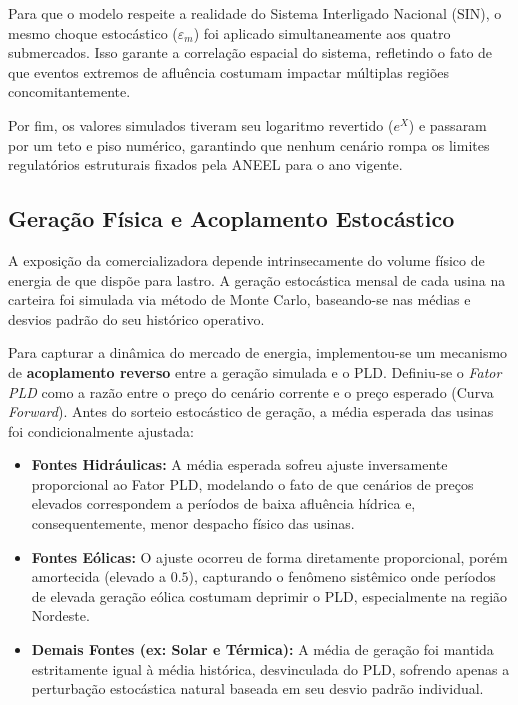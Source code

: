 Para que o modelo respeite a realidade do Sistema Interligado Nacional (SIN), o mesmo choque estocástico ($\varepsilon_m$) foi aplicado simultaneamente aos quatro submercados. Isso garante a correlação espacial do sistema, refletindo o fato de que eventos extremos de afluência costumam impactar múltiplas regiões concomitantemente. 

Por fim, os valores simulados tiveram seu logaritmo revertido ($e^X$) e passaram por um teto e piso numérico, garantindo que nenhum cenário rompa os limites regulatórios estruturais fixados pela ANEEL para o ano vigente.

\subsection{Geração Física e Acoplamento Estocástico}

A exposição da comercializadora depende intrinsecamente do volume físico de energia de que dispõe para lastro. A geração estocástica mensal de cada usina na carteira foi simulada via método de Monte Carlo, baseando-se nas médias e desvios padrão do seu histórico operativo.

Para capturar a dinâmica do mercado de energia, implementou-se um mecanismo de \textbf{acoplamento reverso} entre a geração simulada e o PLD. Definiu-se o \textit{Fator PLD} como a razão entre o preço do cenário corrente e o preço esperado (Curva \textit{Forward}). Antes do sorteio estocástico de geração, a média esperada das usinas foi condicionalmente ajustada:
\begin{itemize}
    \item \textbf{Fontes Hidráulicas:} A média esperada sofreu ajuste inversamente proporcional ao Fator PLD, modelando o fato de que cenários de preços elevados correspondem a períodos de baixa afluência hídrica e, consequentemente, menor despacho físico das usinas.
    \item \textbf{Fontes Eólicas:} O ajuste ocorreu de forma diretamente proporcional, porém amortecida (elevado a $0.5$), capturando o fenômeno sistêmico onde períodos de elevada geração eólica costumam deprimir o PLD, especialmente na região Nordeste.
    \item \textbf{Demais Fontes (ex: Solar e Térmica):} A média de geração foi mantida estritamente igual à média histórica, desvinculada do PLD, sofrendo apenas a perturbação estocástica natural baseada em seu desvio padrão individual.
\end{itemize}

